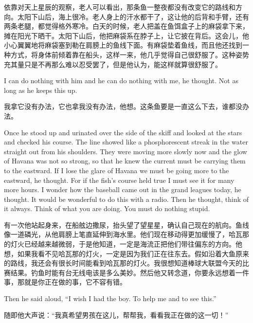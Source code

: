 \begin{paracol}{2}
\switchcolumn

依靠对天上星辰的观察，老人可以看出，那条鱼一整夜都没有改变它的路线和方向。太阳下山后，海上很冷。老人身上的汗水都干了，这让他的后背和手臂，还有两条老腿，都觉得格外寒冷。白天的时候，老人把盖在鱼饵盒子上的麻袋拿下来，摊在阳光下晒干。太阳下山后，他把麻袋系在脖子上，让它披在背后。这会儿，他小心翼翼地将麻袋塞到勒在肩膀上的鱼线下面。有麻袋垫着鱼线，而且他还找到一种方式，将身体前倾着靠在船头，这样一来，他几乎觉得自己很舒服了。这种姿势充其量只是不再那么难以忍受罢了，但是他认为，能这样就算很舒服了。

\switchcolumn*

I can do nothing with him and he can do nothing with me, he thought. Not as
long as he keeps this up.

\switchcolumn

我拿它没有办法，它也拿我没有办法，他想。这条鱼要是一直这么下去，谁都没办法。

\switchcolumn*

Once he stood up and urinated over the side of the skiff and looked at
the stars and checked his course. The line showed like a
\gls{phosphorescent} \gls{streak} in the water straight out from his
shoulders. They were moving more slowly now and the glow of Havana was not
so strong, so that he knew the current must be carrying them to the
\gls{eastward}. If I lose the glare of Havana we must be going more to the
eastward, he thought. For if the fish's course held true I must see it for
many more hours. I wonder how the baseball came out in the grand leagues
today, he thought. It would be wonderful to do this with a radio. Then he
thought, think of it always. Think of what you are doing. You must do
nothing stupid.

\switchcolumn

有一次他站起身来，在船舷边撒尿，抬头望了望星星，确认自己现在的航向。鱼线像一道磷光，从他肩膀上笔直延伸到海水里。他们现在移动得更加缓慢了，哈瓦那的灯火已经越来越微弱，于是他知道，一定是海流正把他们带往偏东的方向。他想，如果我看不见哈瓦那的灯火，一定是因为我们正在往东去。假如沿着大鱼原来的路线，我还会有很长时间能看到哈瓦那的灯火。我很想知道棒球大联盟今天的比赛结果。钓鱼时能有台无线电该是多么美妙。然后他又转念道，你要永远想着一件事，那就是你正在做的事，它不容有错。

\switchcolumn*

Then he said aloud, ``I wish I had the boy. To help me and to see this.''

\switchcolumn

随即他大声说：“我真希望男孩在这儿，帮帮我，看看我正在做的这一切！”


\end{paracol}
